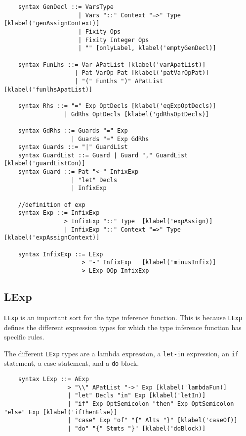 \begin{lstlisting}
    syntax GenDecl ::= VarsType
                     | Vars "::" Context "=>" Type   [klabel('genAssignContext)]
                     | Fixity Ops
                     | Fixity Integer Ops
                     | "" [onlyLabel, klabel('emptyGenDecl)]

    syntax FunLhs ::= Var APatList [klabel('varApatList)]
                    | Pat VarOp Pat [klabel('patVarOpPat)]
                    | "(" FunLhs ")" APatList [klabel('funlhsApatList)]

    syntax Rhs ::= "=" Exp OptDecls [klabel('eqExpOptDecls)]
                 | GdRhs OptDecls [klabel('gdRhsOptDecls)]

    syntax GdRhs ::= Guards "=" Exp
                   | Guards "=" Exp GdRhs
    syntax Guards ::= "|" GuardList
    syntax GuardList ::= Guard | Guard "," GuardList  [klabel('guardListCon)]
    syntax Guard ::= Pat "<-" InfixExp
                   | "let" Decls
                   | InfixExp

    //definition of exp
    syntax Exp ::= InfixExp
                 > InfixExp "::" Type  [klabel('expAssign)]
                 | InfixExp "::" Context "=>" Type  [klabel('expAssignContext)]

    syntax InfixExp ::= LExp
                      > "-" InfixExp   [klabel('minusInfix)]
                      > LExp QOp InfixExp
\end{lstlisting}

\subsection{LExp}
\texttt{LExp} is an important sort for the type inference function. This is because \texttt{LExp} defines the different expression types for which the type inference function has specific rules.

The different \texttt{LExp} types are a lambda expression, a \texttt{let-in} expression, an \texttt{if} statement, a case statement, and a \texttt{do} block.

\begin{lstlisting}
    syntax LExp ::= AExp
                  > "\\" APatList "->" Exp [klabel('lambdaFun)]
                  | "let" Decls "in" Exp [klabel('letIn)]
                  | "if" Exp OptSemicolon "then" Exp OptSemicolon "else" Exp [klabel('ifThenElse)]
                  | "case" Exp "of" "{" Alts "}" [klabel('caseOf)]
                  | "do" "{" Stmts "}" [klabel('doBlock)]

\end{lstlisting}

